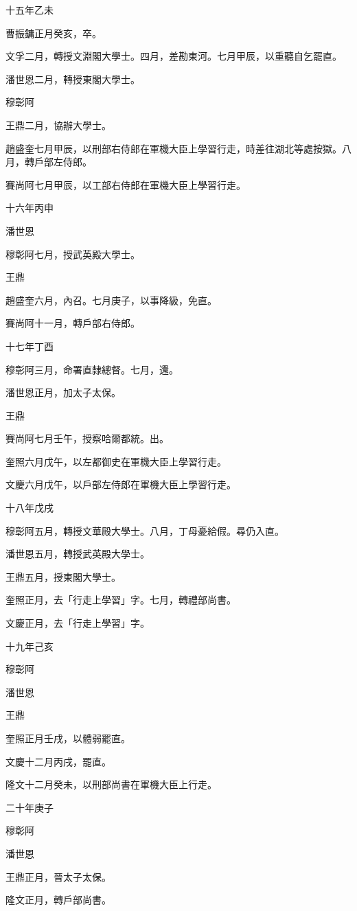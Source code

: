 \begin{pinyinscope}
十五年乙未

曹振鏞正月癸亥，卒。

文孚二月，轉授文淵閣大學士。四月，差勘東河。七月甲辰，以重聽自乞罷直。

潘世恩二月，轉授東閣大學士。

穆彰阿

王鼎二月，協辦大學士。

趙盛奎七月甲辰，以刑部右侍郎在軍機大臣上學習行走，時差往湖北等處按獄。八月，轉戶部左侍郎。

賽尚阿七月甲辰，以工部右侍郎在軍機大臣上學習行走。

十六年丙申

潘世恩

穆彰阿七月，授武英殿大學士。

王鼎

趙盛奎六月，內召。七月庚子，以事降級，免直。

賽尚阿十一月，轉戶部右侍郎。

十七年丁酉

穆彰阿三月，命署直隸總督。七月，還。

潘世恩正月，加太子太保。

王鼎

賽尚阿七月壬午，授察哈爾都統。出。

奎照六月戊午，以左都御史在軍機大臣上學習行走。

文慶六月戊午，以戶部左侍郎在軍機大臣上學習行走。

十八年戊戌

穆彰阿五月，轉授文華殿大學士。八月，丁母憂給假。尋仍入直。

潘世恩五月，轉授武英殿大學士。

王鼎五月，授東閣大學士。

奎照正月，去「行走上學習」字。七月，轉禮部尚書。

文慶正月，去「行走上學習」字。

十九年己亥

穆彰阿

潘世恩

王鼎

奎照正月壬戌，以體弱罷直。

文慶十二月丙戌，罷直。

隆文十二月癸未，以刑部尚書在軍機大臣上行走。

二十年庚子

穆彰阿

潘世恩

王鼎正月，晉太子太保。

隆文正月，轉戶部尚書。


\end{pinyinscope}
